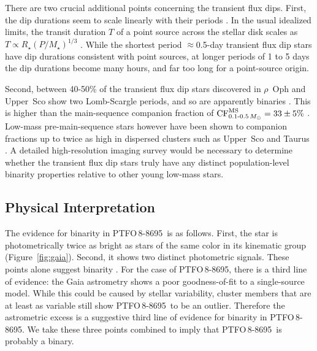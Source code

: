 \documentclass[12pt,twocolumn,tighten]{aastex62}
\newcommand{\ptfo}{PTFO$\,$8-8695}
\begin{document}
There are two crucial additional points concerning the transient flux
dips.  First, the dip durations seem to scale linearly with their
periods \citep[][Figure~26]{stauffer_orbiting_2017}.  In the usual
idealized limits, the transit duration $T$ of a point source across
the stellar disk scales as $T \propto R_\star (P/M_\star)^{1/3}$
\citep{winn_exoplanet_2010}.  While the shortest period
$\approx$0.5-day transient flux dip stars have dip durations
consistent with point sources, at longer periods of 1 to 5 days the
dip durations become many hours, and far too long for a point-source
origin.

Second, between 40-50\% of the transient flux dip stars discovered in
$\rho$~Oph and Upper~Sco show two
Lomb-Scargle periods, and so are apparently binaries
\citep[][Table~1]{stauffer_orbiting_2017}.
This is higher than the main-sequence companion
fraction of ${\rm CF}_{0.1\text{-}0.5\,M_\odot}^{\rm MS} = 33 \pm 5\%$
\citep{henry_solar_2006,duchene_stellar_2013}.
Low-mass pre-main-sequence stars however have been shown to 
companion fractions up to twice as high in dispersed clusters such as
Upper~Sco and Taurus \citep{kraus_mapping_2008,kraus_mapping_2011}.
A detailed high-resolution imaging survey would be necessary to determine
whether the transient flux dip stars truly have any distinct
population-level binarity properties relative to other young low-mass
stars.


\subsection{Physical Interpretation}
\label{subsec:physical}

The evidence for binarity in \ptfo\ is as follows.  First, the star is
photometrically twice as bright as stars of the same color in its
kinematic group (Figure~\ref{fig:gaia}).  Second, it shows two distinct
photometric signals.  These points alone suggest binarity
\citep{stauffer_rotevol_2018}.  For the case of \ptfo, there is a
third line of evidence: the Gaia astrometry shows a poor
goodness-of-fit to a single-source model.  While this could be caused
by stellar variability, cluster members
that are at least as variable still show \ptfo\ to be an
outlier.  Therefore the astrometric excess is a suggestive third line
of evidence for binarity in \ptfo.  We take these three points
combined to imply that \ptfo\ is probably a binary.
\end{document}
